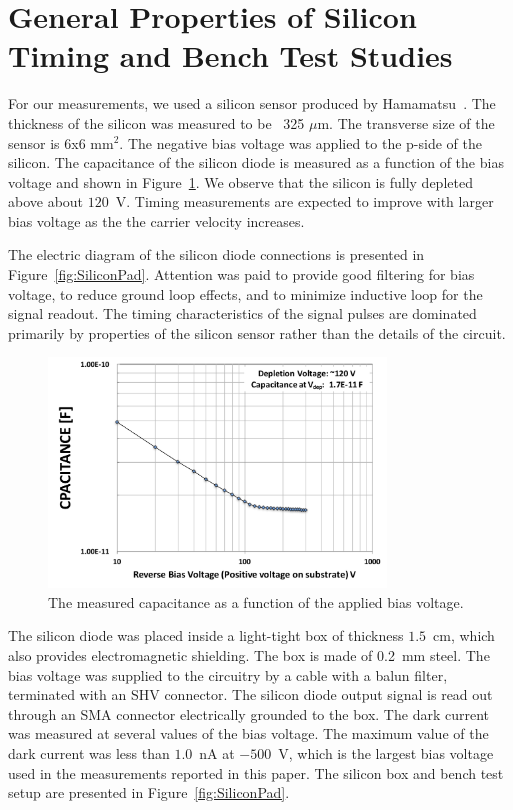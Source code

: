 \section{General Properties of Silicon Timing and Bench Test Studies}
\label{sec:siliconpad}

For our measurements, we used a silicon sensor produced by
Hamamatsu~\cite{hamamatsu}. The thickness of the silicon was measured to be ~325
$\mu$m. The transverse size of the sensor is 6x6 mm$^2$. The negative bias
voltage was applied to the p-side of the silicon. The capacitance
of the silicon diode is measured as a function of the bias voltage
and shown in Figure~\ref{fig:SiliconDiode}. We observe that the silicon
is fully depleted above about $120$~V. Timing measurements are expected
to improve with larger bias voltage as the the carrier velocity increases.

The electric diagram of the silicon
diode connections is presented in Figure~\ref{fig:SiliconPad}. Attention was
paid to provide good filtering for bias voltage, to reduce ground loop effects, and
to minimize inductive loop for the signal readout. The timing characteristics
of the signal pulses are dominated primarily by properties of the
silicon sensor rather than the details of the circuit.

\begin{figure}[htbp] 
\centering
\includegraphics[width=0.8\textwidth]{plots/SiliconDiodeCV_v3.pdf} 
\caption{The measured capacitance as a function of the applied bias voltage.} 
\label{fig:SiliconDiode} 
\end{figure} 

The silicon diode was placed inside a light-tight box of thickness $1.5$~cm,
which also provides electromagnetic shielding. The box is made of 0.2~mm steel.
The bias voltage was supplied to the circuitry by a cable with a balun filter,
terminated with an SHV connector. The silicon diode output signal is read out
through an SMA connector electrically grounded to the box. The dark current was
measured at several values of the bias voltage. The maximum value of the dark
current was less than $1.0$~nA at $-500$~V, which is the largest bias voltage
used in the measurements reported in this paper. The silicon box and bench test
setup are presented in Figure~\ref{fig:SiliconPad}. 

